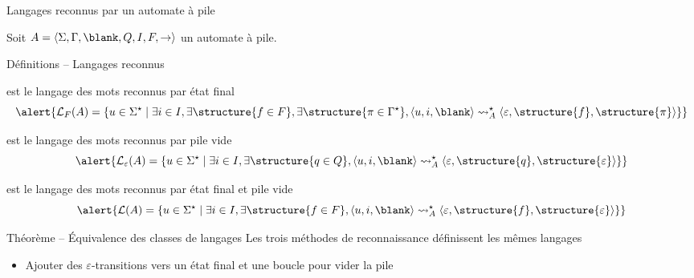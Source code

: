 
\begingroup

\begin{frame}{Langages reconnus par un automate à pile}
  
  Soit $A=\langle \Sigma, \Gamma, \blank, Q, I, F, \rightarrow \rangle$ un automate à pile.

  \begin{block}{Définitions -- Langages reconnus}
    \begin{description}[xxxxxx]
    \item[$\mathcal{L}_F(A)$] est le langage des mots reconnus \alert{par état final}
      $$\alert{\mathcal{L}_F(A) = \{u \in \Sigma^\star \mid
      \exists i\in I, \exists \structure{f\in F}, \exists \structure{\pi\in\Gamma^\star}, \langle u, i, \blank \rangle \leadsto_A^\star \langle \varepsilon, \structure{f}, \structure{\pi} \rangle\}}$$
    \item[$\mathcal{L}_\varepsilon(A)$] est le langage des mots reconnus \alert{par pile vide}
      $$\alert{\mathcal{L}_\varepsilon(A) = \{u \in \Sigma^\star \mid
      \exists i\in I, \exists \structure{q\in Q}, \langle u, i, \blank \rangle \leadsto_A^\star \langle \varepsilon, \structure{q}, \structure{\varepsilon} \rangle\}}$$
    \item[$\mathcal{L}(A)$] est le langage des mots reconnus \alert{par état final et pile vide}
      $$\alert{\mathcal{L}(A) = \{u \in \Sigma^\star \mid
      \exists i\in I, \exists \structure{f\in F}, \langle u, i, \blank \rangle \leadsto_A^\star \langle \varepsilon, \structure{f}, \structure{\varepsilon} \rangle\}}$$
    \end{description}
  \end{block}

  \begin{block}{Théorème -- Équivalence des classes de langages}
    Les trois méthodes de reconnaissance définissent les mêmes langages
    \begin{itemize}
    \item Ajouter des $\varepsilon$-transitions vers un état final et une boucle pour vider la pile
    \end{itemize}
  \end{block}

\end{frame}

\endgroup
\endinput
